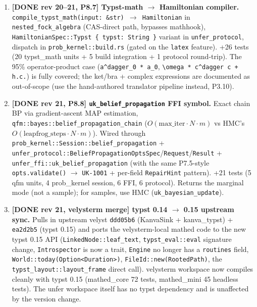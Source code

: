 \documentclass[11pt, a4paper]{article}
\begin{document}
\begin{enumerate}
\item \textbf{[DONE rev 20--21, P8.7] Typst-math $\to$ Hamiltonian
  compiler.} \texttt{compile\_typst\_math(input: \&str) $\to$ Hamiltonian}
  in \texttt{nested\_fock\_algebra} (CAS-direct path, bypasses
  mathhook), \texttt{HamiltonianSpec::Typst \{ typst: String \}}
  variant in \texttt{unfer\_protocol}, dispatch in
  \texttt{prob\_kernel::build.rs} (gated on the \texttt{latex}
  feature). +26 tests (20 typst\_math units + 5 build integration
  + 1 protocol round-trip). The 95\% operator-product case
  (\texttt{a\^{}dagger\_0 * a\_0}, \texttt{\textbackslash omega *
  c\^{}dagger c + h.c.}) is fully covered; the ket/bra + complex
  expressions are documented as out-of-scope (use the
  hand-authored translator pipeline instead, P3.10).

\item \textbf{[DONE rev 21, P8.8] \texttt{uk\_belief\_propagation}
  FFI symbol.} Exact chain BP via gradient-ascent MAP
  estimation, \texttt{qfm::bayes::belief\_propagation\_chain}
  (\(O(\mathrm{max\_iter} \cdot N \cdot m)\) vs HMC's
  \(O(\mathrm{leapfrog\_steps} \cdot N \cdot m)\)). Wired through
  \texttt{prob\_kernel::Session::belief\_propagation} +
  \texttt{unfer\_protocol::BeliefPropagationOptsSpec}/\texttt{Request}/\texttt{Result}
  + \texttt{unfer\_ffi::uk\_belief\_propagation} (with the same
  P7.5-style \texttt{opts.validate()} $\to$ \texttt{UK-1001} +
  per-field \texttt{RepairHint} pattern). +21 tests (5 qfm
  units, 4 prob\_kernel session, 6 FFI, 6 protocol). Returns the
  marginal mode (not a sample); for samples, use HMC
  (\texttt{uk\_bayesian\_update}).

\item \textbf{[DONE rev 21, velysterm merge] typst 0.14 $\to$ 0.15
  upstream sync.} Pulls in upstream velyst \texttt{ddd05b6}
  (KanvaSink + kanva\_typst) + \texttt{ea2d2b5} (typst 0.15) and
  ports the velysterm-local mathed code to the new typst 0.15
  API (\texttt{LinkedNode::leaf\_text}, \texttt{typst\_eval::eval}
  signature change, \texttt{Introspector} is now a trait,
  \texttt{Engine} no longer has a \texttt{routines} field,
  \texttt{World::today(Option<Duration>)},
  \texttt{FileId::new(RootedPath)}, the
  \texttt{typst\_layout::layout\_frame} direct call). velysterm
  workspace now compiles cleanly with typst 0.15 (mathed\_core
  72 tests, mathed\_mini 45 headless tests). The unfer workspace
  itself has no typst dependency and is unaffected by the
  version change.


\end{enumerate}
\end{document}
